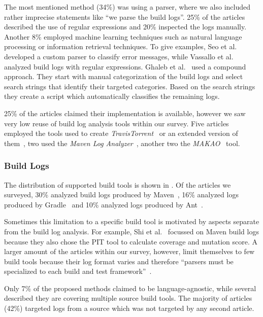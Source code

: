 The most mentioned method (34\%) was using a parser, where we also
included
rather imprecise statements like ``we parse the build logs''.
25\% of the articles described the use of regular expressions and 20\%
inspected the logs manually.
Another 8\% employed machine learning techniques such as natural language
processing or information retrieval techniques.
To give examples,
Seo et al.~\cite{seo2014programmers} developed a custom
parser to classify error messages, while Vassallo et
al.~\cite{vassallo2017a-tale} analyzed build logs with regular
expressions.
Ghaleb et al.~\cite{ghaleb2019studying} used a compound approach.
They start with manual categorization of the build logs and select
search strings that identify their targeted categories.
Based on the search strings they create a script which automatically
classifies the remaining logs.

25\% of the articles claimed their implementation is available,
however we
saw very low reuse of build log analysis tools within our survey.
Five articles employed the tools used to create
\emph{TravisTorrent}~\cite{beller2017travistorrent,beller2017oops,
orellana2017differences,zhao2018comparing} or
an extended version of them~\cite{rott2019empirische,
shi2018evaluating},
two used the
\emph{Maven Log Analyzer}~\cite{macho2018automatically,gallaba2018noise},
another two the
\emph{MAKAO}~\cite{wen2018blimp,adams2007design,adams2007makao} tool.

\subsubsection{Build Logs}
The distribution of supported build tools is shown in
.
Of the articles we surveyed, 30\% analyzed build logs produced by
Maven~\cite{maven2019website}, 16\% analyzed logs produced by
Gradle~\cite{gradle2020website}
and 10\% analyzed logs produced by Ant~\cite{ant2020website}.

Sometimes this limitation to a specific build tool is motivated by
aspects separate from the build log analysis.
For example, Shi et al.~\cite{shi2018evaluating} focussed on Maven
build logs because they also chose the PIT tool to calculate coverage
and mutation score.
A larger amount of the articles within our survey, however, limit
themselves to few build tools because their log format varies and
therefore ``parsers must be specialized to each build and test
framework''~\cite{tomassi2019bugswarm}.

Only 7\% of the proposed methods claimed to be language-agnostic, while
several described they are covering multiple source build tools.
The majority of articles (42\%) targeted logs from a source which was not
targeted by any second article.


